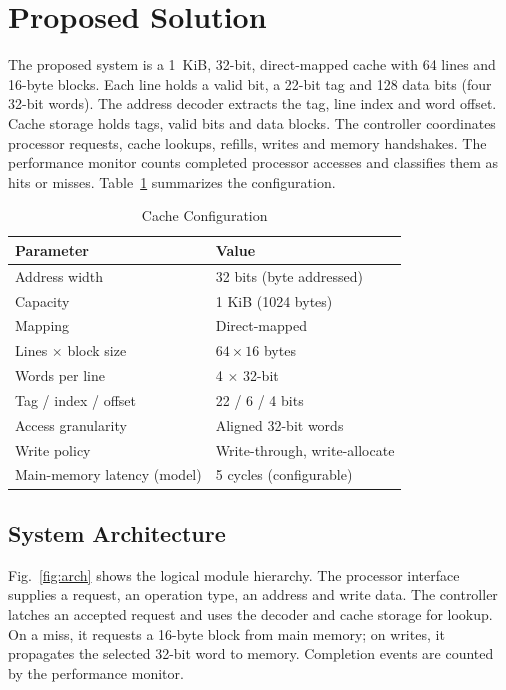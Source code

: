 \documentclass[conference,a4paper]{IEEEtran}
\begin{document}
\section{Proposed Solution}\label{sec:sol}
The proposed system is a 1~KiB, 32-bit, direct-mapped cache with 64 lines and 16-byte blocks. Each line holds a valid bit, a 22-bit tag and 128 data bits (four 32-bit words). The address decoder extracts the tag, line index and word offset. Cache storage holds tags, valid bits and data blocks. The controller coordinates processor requests, cache lookups, refills, writes and memory handshakes. The performance monitor counts completed processor accesses and classifies them as hits or misses. Table~\ref{tab:cfg} summarizes the configuration.

\begin{table}[!t]
\caption{Cache Configuration}\label{tab:cfg}
\centering
\renewcommand{\arraystretch}{1.1}
\begin{tabular}{@{}ll@{}}
\toprule
\textbf{Parameter} & \textbf{Value}\\
\midrule
Address width & 32 bits (byte addressed)\\
Capacity & 1 KiB (1024 bytes)\\
Mapping & Direct-mapped\\
Lines $\times$ block size & $64 \times 16$ bytes\\
Words per line & 4 $\times$ 32-bit\\
Tag / index / offset & 22 / 6 / 4 bits\\
Access granularity & Aligned 32-bit words\\
Write policy & Write-through, write-allocate\\
Main-memory latency (model) & 5 cycles (configurable)\\
\bottomrule
\end{tabular}
\end{table}

\subsection{System Architecture}\label{sec:arch}
Fig.~\ref{fig:arch} shows the logical module hierarchy. The processor interface supplies a request, an operation type, an address and write data. The controller latches an accepted request and uses the decoder and cache storage for lookup. On a miss, it requests a 16-byte block from main memory; on writes, it propagates the selected 32-bit word to memory. Completion events are counted by the performance monitor.
\end{document}
